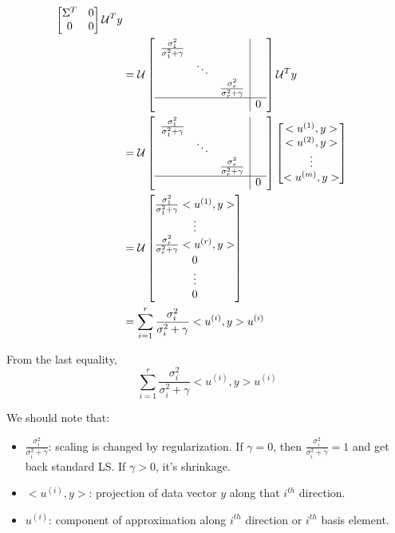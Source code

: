 \begin{align*}
\begin{bmatrix}
\Sigma^T & 0\\
0 & 0
\end{bmatrix}
\mathcal{U}^Ty\\
&= \mathcal{U}
\left[
\begin{array}{c|c}
\begin{matrix}
\frac{\sigma_1^2}{\sigma_1^2+\gamma} & &\\
&\ddots&\\
&&\frac{\sigma_r^2}{\sigma_r^2+\gamma}
\end{matrix}&  \\ \hline 
& 0
\end{array}
\right]
\mathcal{U}^Ty
\\
&= \mathcal{U}
\left[
\begin{array}{c|c}
\begin{matrix}
\frac{\sigma_1^2}{\sigma_1^2+\gamma} & &\\
&\ddots&\\
&&\frac{\sigma_r^2}{\sigma_r^2+\gamma}
\end{matrix}&  \\ \hline 
& 0
\end{array}
\right]
\begin{bmatrix}
<u^{(1)}, y>\\
<u^{(2)}, y>\\
\vdots\\
<u^{(m)}, y>
\end{bmatrix}\\
&=\mathcal{U}
\begin{bmatrix}
\frac{\sigma_1^2}{\sigma_1^2+\gamma}<u^{(1)}, y>\\
\vdots\\
\frac{\sigma_r^2}{\sigma_r^2+\gamma}<u^{(r)}, y>\\
0\\
\vdots\\
0
\end{bmatrix}\\
&= \sum^r_{i=1}\frac{\sigma_i^2}{\sigma_i^2 + \gamma}<u^{(i)}, y>u^{(i)}
\end{align*}

From the last equality,
\begin{equation*}
\sum^r_{i=1}\frac{\sigma_i^2}{\sigma_i^2 + \gamma}<u^{(i)}, y>u^{(i)}
\end{equation*}

We should note that:
\begin{itemize}
	\item $\frac{\sigma_i^2}{\sigma_i^2 + \gamma}$: scaling is changed by regularization. If $\gamma = 0$, then  $\frac{\sigma_i^2}{\sigma_i^2 + \gamma} = 1$ and get back standard LS. If $\gamma > 0$, it's shrinkage. 
	
	\item $<u^{(i)}, y>$: projection of data vector $y$ along that $i^{th}$ direction. 
	
	\item $u^{(i)}$: component of approximation along $i^{th}$ direction or $i^{th}$ basis element. 
\end{itemize}



